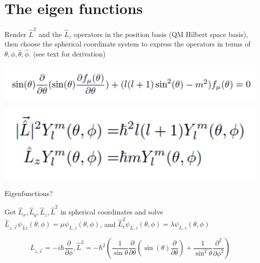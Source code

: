 \documentclass{article}
\begin{document}
\section{The eigen functions}

Render  $\hat{L}^2$ and the $\hat{L}_z$ operators in the position basis (QM Hilbert space basis), then choose the spherical coordinate system to express the operators in terms of  $\theta, \phi, \hat{\theta}, \hat{\phi}$. (see text for derivation)   

\includegraphics[width = 0.3 \textwidth]{Lecture22/4.png}


\includegraphics[width = 0.3 \textwidth]{Lecture22/5.png}

Eigenfunctions?

Get $\hat{L}_x, \hat{L}_y, \hat{L}_z, \hat{L}^2$ in spherical coordinates and solve $\hat{L}_{z, \vec r} \psi_{Lz}(\theta,\phi) = \mu \psi_{L,z} (\theta, \phi)$, and  $\hat{L}_r^2 \psi_{L,z} (\theta,\phi) = \lambda \psi_{L,z} (\theta, \phi)$

$$L_{z,\vec{r}} = - i \hbar \frac{\partial}{\partial \phi}, \hat{L}^2 = - \hbar^2 \left( \frac{1}{\sin{\theta}} \frac{\partial}{\partial \theta} \left( \sin(\theta) \frac{\partial}{\partial \theta} \right) + \frac{1}{\sin^2 \theta} \frac{\partial^2}{\partial \phi^2} \right)$$

\end{document}
